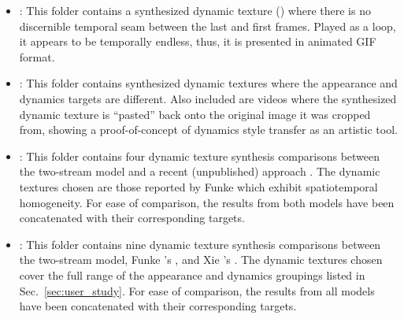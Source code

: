 \begin{itemize}
	\item {}: This folder contains a synthesized dynamic texture () where there is no discernible temporal seam between the last and first frames. Played as a loop, it appears to be temporally endless, thus, it is presented in animated GIF format.
	\item {}: This folder contains synthesized dynamic textures where the appearance and dynamics targets are different. Also included are videos where the synthesized dynamic texture is ``pasted'' back onto the original image it was cropped from, showing a proof-of-concept of dynamics style transfer as an artistic tool.
	\item {}: This folder contains four dynamic texture synthesis comparisons between the two-stream model and a recent (unpublished) approach \cite{funke2017}. The dynamic textures chosen are those reported by Funke \etal \cite{funke2017} which exhibit spatiotemporal homogeneity. For ease of comparison, the results from both models have been concatenated with their corresponding targets.
	\item {}: This folder contains nine dynamic texture synthesis comparisons between the two-stream model, Funke \etal's \cite{funke2017}, and Xie \etal's \cite{xie2017synthesizing}. The dynamic textures chosen cover the full range of the appearance and dynamics groupings listed in Sec.\ \ref{sec:user_study}. For ease of comparison, the results from all models have been concatenated with their corresponding targets.
\end{itemize}
